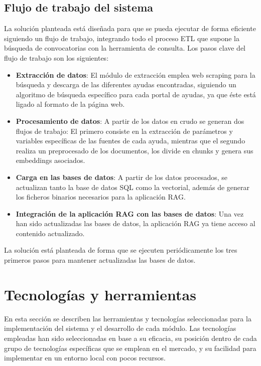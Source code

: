 \subsection{Flujo de trabajo del sistema}

La solución planteada está diseñada para que se pueda ejecutar de forma eficiente siguiendo un flujo de trabajo, integrando todo el proceso ETL que supone la búsqueda de convocatorias con la herramienta de consulta.
Los pasos clave del flujo de trabajo son los siguientes:

\begin{itemize}
    \item \textbf{Extracción de datos}:
    El módulo de extracción emplea web scraping para la búsqueda y descarga de las diferentes ayudas encontradas, siguiendo un algoritmo de búsqueda específico para cada portal de ayudas, ya que éste está ligado al formato de la página web.

    \item \textbf{Procesamiento de datos}:
    A partir de los datos en crudo se generan dos flujos de trabajo: El primero consiste en la extracción de parámetros y variables específicas de las fuentes de cada ayuda, mientras que el segundo realiza un preprocesado de los documentos, los divide en chunks y genera sus embeddings asociados.

    \item \textbf{Carga en las bases de datos}: A partir de los datos procesados, se actualizan tanto la base de datos SQL como la vectorial, además de generar los ficheros binarios necesarios para la aplicación RAG.

    \item \textbf{Integración de la aplicación RAG con las bases de datos}:
    Una vez han sido actualizadas las bases de datos, la aplicación RAG ya tiene acceso al contenido actualizado.
\end{itemize}

La solución está planteada de forma que se ejecuten periódicamente los tres primeros pasos para mantener actualizadas las bases de datos.


\section{Tecnologías y herramientas}

En esta sección se describen las herramientas y tecnologías seleccionadas para la implementación del sistema y el desarrollo de cada módulo.
Las tecnologías empleadas han sido seleccionadas en base a su eficacia, su posición dentro de cada grupo de tecnologías específicas que se emplean en el mercado, y su facilidad para implementar en un entorno local con pocos recursos.


